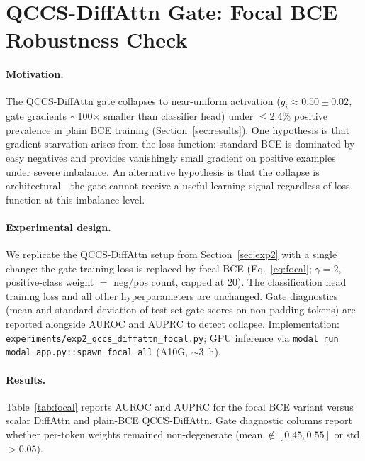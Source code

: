 \documentclass{article}
\begin{document}

\section{QCCS-DiffAttn Gate: Focal BCE Robustness Check}
\label{app:focal}

\paragraph{Motivation.}
The QCCS-DiffAttn gate collapses to near-uniform activation
($g_i \approx 0.50 \pm 0.02$, gate gradients $\sim$100$\times$ smaller
than classifier head) under $\leq$2.4\% positive prevalence in plain BCE
training (Section~\ref{sec:results}). One hypothesis is that gradient
starvation arises from the loss function: standard BCE is dominated by
easy negatives and provides vanishingly small gradient on positive examples
under severe imbalance. An alternative hypothesis is that the collapse is
architectural---the gate cannot receive a useful learning signal regardless
of loss function at this imbalance level.

\paragraph{Experimental design.}
We replicate the QCCS-DiffAttn setup from Section~\ref{sec:exp2} with a
single change: the gate training loss is replaced by focal BCE
(Eq.~\ref{eq:focal}; $\gamma=2$, positive-class weight $=$ neg/pos count,
capped at 20). The classification head training loss and all other
hyperparameters are unchanged. Gate diagnostics (mean and standard deviation
of test-set gate scores on non-padding tokens) are reported alongside AUROC
and AUPRC to detect collapse. Implementation:
\texttt{experiments/exp2\_qccs\_diffattn\_focal.py}; GPU inference via
\texttt{modal run modal\_app.py::spawn\_focal\_all} (A10G, $\sim$3~h).

\paragraph{Results.}
Table~\ref{tab:focal} reports AUROC and AUPRC for the focal BCE variant
versus scalar DiffAttn and plain-BCE QCCS-DiffAttn. Gate diagnostic columns
report whether per-token weights remained non-degenerate (mean $\notin [0.45, 0.55]$
or std $> 0.05$).
\end{document}
